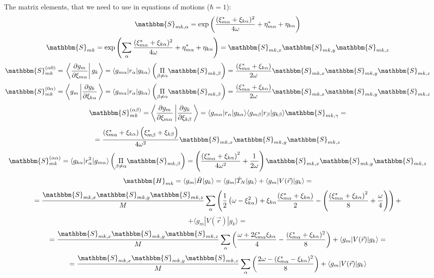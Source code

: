 The matrix elements, that we need to use in equations of motions ($\hbar=1$):
$$\mathbbm{S}_{mk,\alpha}=\text{exp}\left(\frac{(\xi_{m\alpha}^*+\xi_{k\alpha})^2}{4\omega}+\eta_{m\alpha}^*+\eta_{k\alpha} \right)$$
$$\mathbbm{S}_{mk} = \text{exp}\left(\sum_{\alpha} \frac{(\xi_{m\alpha}^*+\xi_{k\alpha})^2}{4\omega}+\eta_{m\alpha}^*+\eta_{k\alpha}\right)=%
  \mathbbm{S}_{mk,x}\mathbbm{S}_{mk,y}\mathbbm{S}_{mk,z}$$
$$\mathbbm{S}_{mk}^{(\alpha0)}=\left.\left\langle\frac{\partial g_m}{\partial\xi_{m\alpha}}\right|g_k\right\rangle=%
  \langle g_{m\alpha}|r_{\alpha}|g_{k\alpha}\rangle\left(\underset{\beta\neq\alpha}{\Pi}\mathbbm{S}_{mk,\beta}\right)=%
  \frac{\left(\xi_{m\alpha}^*+\xi_{k\alpha}\right)}{2\omega}\mathbbm{S}_{mk,x}\mathbbm{S}_{mk,y}\mathbbm{S}_{mk,z}$$
$$\mathbbm{S}_{mk}^{(0\alpha)}=\left\langle g_m\left|\frac{\partial g_k}{\partial\xi_{k\alpha}}\right.\right\rangle=%
  \langle g_{m\alpha}|r_{\alpha}|g_{k\alpha}\rangle\left(\underset{\beta\neq\alpha}{\Pi}\mathbbm{S}_{mk,\beta}\right)=%
  \frac{\left(\xi_{m\alpha}^*+\xi_{k\alpha}\right)}{2\omega}\mathbbm{S}_{mk,x}\mathbbm{S}_{mk,y}\mathbbm{S}_{mk,z}$$
$$\mathbbm{S}_{mk}^{(\alpha\beta)}=\left\langle\frac{\partial g_m}{\partial\xi_{m\alpha}}\left|\frac{\partial g_k}{\partial\xi_{k\beta}}\right.\right\rangle=%
  \langle g_{m\alpha}|r_{\alpha}|g_{k\alpha}\rangle\langle g_{m\beta}|r_{\beta}|g_{k\beta}\rangle\mathbbm{S}_{mk,\gamma}=$$
$$=\frac{\left(\xi_{m\alpha}^*+\xi_{k\alpha}\right)\left(\xi_{m\beta}^*+\xi_{k\beta}\right)}{4\omega^2}\mathbbm{S}_{mk,x}\mathbbm{S}_{mk,y}\mathbbm{S}_{mk,z}$$
$$\mathbbm{S}_{mk}^{(\alpha\alpha)}=\langle g_{k\alpha}|r_{\alpha}^2|g_{m\alpha}\rangle\left(\underset{\beta\neq\alpha}{\Pi}\mathbbm{S}_{mk,\beta}\right)=%
  \left(\frac{\left(\xi_{m\alpha}^*+\xi_{k\alpha}\right)^2}{4\omega^2}+\frac{1}{2\omega}\right)\mathbbm{S}_{mk,x}\mathbbm{S}_{mk,y}\mathbbm{S}_{mk,z}$$
$$\mathbbm{H}_{mk}=\langle g_m|\hat{H}|g_k\rangle=\langle g_m|\hat{T}_N|g_k\rangle+\langle g_m|V(\vec{r})|g_k\rangle=$$
$$=\frac{\mathbbm{S}_{mk,x}\mathbbm{S}_{mk,y}\mathbbm{S}_{mk,z}}{M}%
		       \sum_{\alpha}\left( \frac{1}{2}\left(\omega-\xi_{k\alpha}^2\right)+%
		       \xi_{k\alpha}\frac{\left(\xi_{m\alpha}^*+\xi_{k\alpha}\right)}{2}-%
		       \left(\frac{\left(\xi_{m\alpha}^*+\xi_{k\alpha}\right)^2}{8}+\frac{\omega}{4}\right)\right)+$$
$$+\langle g_m|V(\vec{r})|g_k\rangle=$$
$$=\frac{\mathbbm{S}_{mk,x}\mathbbm{S}_{mk,y}\mathbbm{S}_{mk,z}}{M}%
   \sum_{\alpha}\left(\frac{\omega+2\xi_{m\alpha}^*\xi_{k\alpha}}{4}-\frac{(\xi_{m\alpha}^*+\xi_{k\alpha})^2}{8} \right)+\langle g_m|V(\vec{r})|g_k\rangle=$$
$$=\frac{\mathbbm{S}_{mk,x}\mathbbm{S}_{mk,y}\mathbbm{S}_{mk,z}}{M}%
   \sum_{\alpha}\left(\frac{2\omega-(\xi_{m\alpha}^*-\xi_{k\alpha})^2}{8} \right)+\langle g_m|V(\vec{r})|g_k\rangle$$
